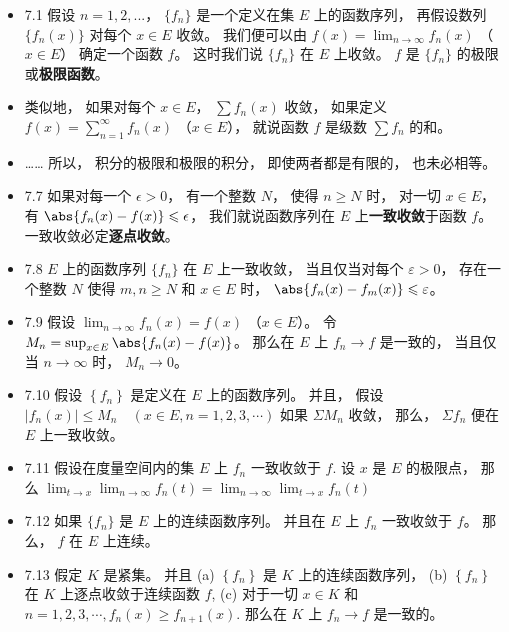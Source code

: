 \begin{itemize}
\item 7.1 假设 $n=1,2,...$， $\{f_n\}$ 是一个定义在集 $E$ 上的函数序列， 再假设数列 $\{f_n(x)\}$ 对每个 $x\in E$ 收敛。 我们便可以由 $f(x) = \lim_{n\to\infty} f_n(x)$ （$x\in E$） 确定一个函数 $f$。 这时我们说 $\{f_n\}$ 在 $E$ 上收敛。 $f$ 是 $\{f_n\}$ 的极限或\textbf{极限函数}。

\item 类似地， 如果对每个 $x\in E$， $\sum f_n(x)$ 收敛， 如果定义 $f(x) = \sum_{n=1}^\infty f_n(x)$ （$x\in E$）， 就说函数 $f$ 是级数 $\sum f_n$ 的和。

\item …… 所以， 积分的极限和极限的积分， 即使两者都是有限的， 也未必相等。

\item 7.7 如果对每一个 $\epsilon >0$， 有一个整数 $N$， 使得 $n\geqslant N$ 时， 对一切 $x\in E$， 有 $\abs{f_n(x)-f(x)} \leqslant \epsilon$， 我们就说函数序列在 $E$ 上\textbf{一致收敛}于函数 $f$。 一致收敛必定\textbf{逐点收敛}。

\item 7.8 $E$ 上的函数序列 $\{f_n\}$ 在 $E$ 上一致收敛， 当且仅当对每个 $\varepsilon>0$， 存在一个整数 $N$ 使得 $m,n\geqslant N$ 和 $x\in E$ 时， $\abs{f_n(x)-f_m(x)}\leqslant \varepsilon$。

\item 7.9 假设 $\lim_{n\to\infty} f_n(x) = f(x)$ （$x\in E$）。 令 $M_n = \sup_{x\in E} \abs{f_n(x)-f(x)}$。 那么在 $E$ 上 $f_n\to f$ 是一致的， 当且仅当 $n\to \infty$ 时， $M_n\to 0$。

\item 7.10 假设 $\left\{f_{n}\right\}$ 是定义在 $E$ 上的函数序列。 并且， 假设 $\left|f_{n}(x)\right| \leqslant M_{n} \quad(x \in E, n=1,2,3, \cdots)$ 如果 $\Sigma M_{n}$ 收敛， 那么， $\Sigma f_{n}$ 便在 $E$ 上一致收敛。

\item 7.11 假设在度量空间内的集 $E$ 上 $f_{n}$ 一致收敛于 $f$. 设 $x$ 是 $E$ 的极限点， 那么 $\lim_{t\to x}\lim_{n\to\infty} f_n(t) = \lim_{n\to\infty}\lim_{t\to x} f_n(t)$

\item 7.12 如果 $\{f_n\}$ 是 $E$ 上的连续函数序列。 并且在 $E$ 上 $f_n$ 一致收敛于 $f$。 那么， $f$ 在 $E$ 上连续。

\item 7.13 假定 $K$ 是紧集。 并且 (a) $\left\{f_{n}\right\}$ 是 $K$ 上的连续函数序列， (b) $\left\{f_{n}\right\}$ 在 $K$ 上逐点收敛于连续函数 $f$, (c) 对于一切 $x \in K$ 和 $n=1,2,3, \cdots, f_{n}(x) \geqslant f_{n+1}(x)$. 那么在 $K$ 上 $f_{n} \rightarrow f$ 是一致的。


\end{itemize}
